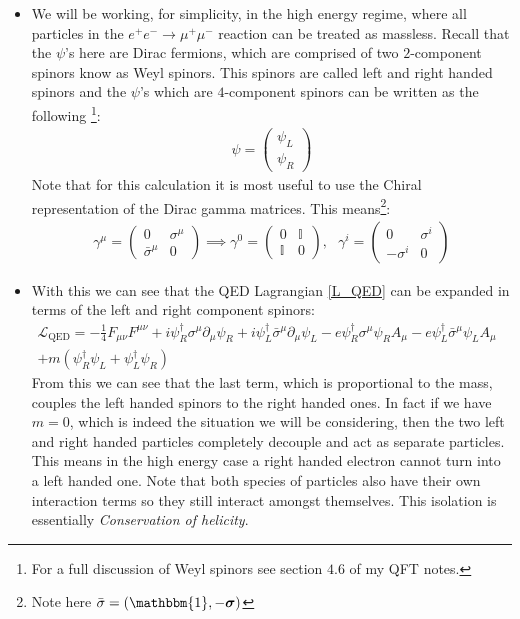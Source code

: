 \documentclass[11pt]{article}
\numberwithin{equation}{section}
\begin{document}
\begin{itemize}
     \item We will be working, for simplicity, in the high energy regime, where all particles in the $e^+e^- \rightarrow \mu^+\mu^-$ reaction can be treated as massless. Recall that the $\psi$'s here are Dirac fermions, which are comprised of two $2$-component spinors know as Weyl spinors. This spinors are called left and right handed spinors and the $\psi$'s which are $4$-component spinors can be written as the following \footnote{For a full discussion of Weyl spinors see section $4.6$ of my QFT notes.}:
     \begin{align*}
        \psi = \begin{pmatrix}
        \psi_L \\
        \psi_R
    \end{pmatrix}
\end{align*}
Note that for this calculation it is most useful to use the Chiral representation of the Dirac gamma matrices. This means\footnote{Note here $\bar{\sigma} = (\mathbbm{1},-\boldsymbol{\sigma})$}:
\begin{align*}
\gamma^{\mu} = \begin{pmatrix}
        0 & \sigma^{\mu} \\
        \bar{\sigma}^{\mu} & 0
      \end{pmatrix} \implies 
    \gamma^{0} = \begin{pmatrix}
      0 & \mathbb{I} \\
      \mathbb{I} & 0 
    \end{pmatrix},  ~~~ \gamma^{i} = \begin{pmatrix}
      0 & \sigma^{i} \\
      -\sigma^{i} & 0 
    \end{pmatrix} 
\end{align*}
\item With this we can see that the QED Lagrangian \ref{L_QED} can be expanded in terms of the left and right component spinors: 
\begin{align*}
    \mathcal{L}_{\text{QED}} = -\frac{1}{4}F_{\mu\nu}F^{\mu\nu} +i\psi_{R}^{\dagger}\sigma^{\mu}\partial_{\mu}\psi_R+i\psi_{L}^{\dagger}\bar{\sigma}^{\mu}\partial_{\mu}\psi_L - e\psi^{\dagger}_R\sigma^{\mu}\psi_RA_{\mu}- e\psi^{\dagger}_L\bar{\sigma}^{\mu}\psi_LA_{\mu}& \\
    + m\left(\psi^{\dagger}_R\psi_L + \psi^{\dagger}_L\psi_R\right)&
\end{align*}
From this we can see that the last term, which is proportional to the mass, couples the left handed spinors to the right handed ones. In fact if we have $m=0$, which is indeed the situation we will be considering, then the two left and right handed particles completely decouple and act as separate particles. This means in the high energy case a right handed electron cannot turn into a left handed one. Note that both species of particles also have their own interaction terms so they still interact amongst themselves. This isolation is essentially \emph{Conservation of helicity}. 


\end{itemize}
\end{document}
